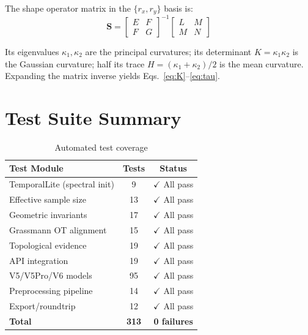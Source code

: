 The shape operator matrix in the $\{r_x, r_y\}$ basis is:
\begin{equation}
    \mathbf{S} = \begin{bmatrix} E & F \\ F & G \end{bmatrix}^{-1}
    \begin{bmatrix} L & M \\ M & N \end{bmatrix}
\end{equation}

Its eigenvalues $\kappa_1, \kappa_2$ are the principal curvatures; its
determinant $K = \kappa_1\kappa_2$ is the Gaussian curvature; half its
trace $H = (\kappa_1 + \kappa_2)/2$ is the mean curvature. Expanding
the matrix inverse yields Eqs.~\eqref{eq:K}--\eqref{eq:tau}.

\section{Test Suite Summary}

\begin{table}[h]
\centering
\caption{Automated test coverage}
\begin{tabular}{lcc}
\toprule
\textbf{Test Module} & \textbf{Tests} & \textbf{Status} \\
\midrule
TemporalLite (spectral init) & 9 & $\checkmark$ All pass \\
Effective sample size & 13 & $\checkmark$ All pass \\
Geometric invariants & 17 & $\checkmark$ All pass \\
Grassmann OT alignment & 15 & $\checkmark$ All pass \\
Topological evidence & 19 & $\checkmark$ All pass \\
API integration & 19 & $\checkmark$ All pass \\
V5/V5Pro/V6 models & 95 & $\checkmark$ All pass \\
Preprocessing pipeline & 14 & $\checkmark$ All pass \\
Export/roundtrip & 12 & $\checkmark$ All pass \\
\textbf{Total} & \textbf{313} & \textbf{0 failures} \\
\bottomrule
\end{tabular}
\end{table}
